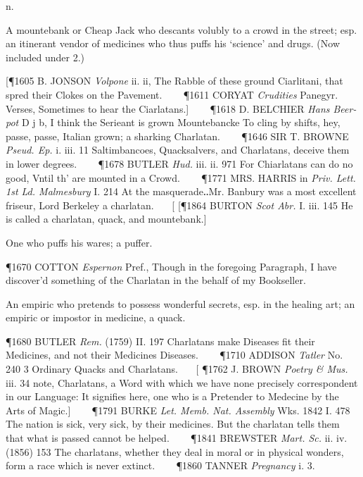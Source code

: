 \begin{description}[wide, labelwidth=!, labelindent=0pt]
\begin{myenumerate}

 n.

 A mountebank or Cheap Jack who descants volubly to a crowd in the street; esp. an itinerant vendor of medicines who thus puffs his ‘science’ and drugs. (Now included under 2.)

[\P 1605 B. JONSON  \textit{Volpone} ii. ii, The Rabble of these ground Ciarlitani, that spred their Clokes on the Pavement.    
\P 1611 CORYAT  \textit{Crudities} Panegyr. Verses, Sometimes to hear the Ciarlatans.]    
\P 1618 D. BELCHIER  \textit{Hans Beer-pot} D j b, I think the Serieant is grown Mountebancke To cling by shifts, hey, passe, passe, Italian grown; a sharking Charlatan.    
\P 1646 SIR T. BROWNE  \textit{Pseud. Ep.} i. iii. 11 Saltimbancoes, Quacksalvers, and Charlatans, deceive them in lower degrees.    
\P 1678 BUTLER  \textit{Hud.} iii. ii. 971 For Chiarlatans can do no good, Vntil th' are mounted in a Crowd.    
\P 1771 MRS. HARRIS in \textit{Priv. Lett. 1st Ld. Malmesbury} I. 214 At the masquerade‥Mr. Banbury was a most excellent friseur, Lord Berkeley a charlatan.    [
[\P 1864 BURTON  \textit{Scot Abr.} I. iii. 145 He is called a charlatan, quack, and mountebank.]

 One who puffs his wares; a puffer.

\P 1670 COTTON  \textit{Espernon} Pref., Though in the foregoing Paragraph, I have discover'd something of the Charlatan in the behalf of my Bookseller.

 An empiric who pretends to possess wonderful secrets, esp. in the healing art; an empiric or impostor in medicine, a quack.

\P 1680 BUTLER  \textit{Rem.} (1759) II. 197 Charlatans make Diseases fit their Medicines, and not their Medicines Diseases.    
\P 1710 ADDISON  \textit{Tatler} No. 240 3 Ordinary Quacks and Charlatans.    [
\P 1762 J. BROWN  \textit{Poetry \& Mus.} iii. 34 note, Charlatans, a Word with which we have none precisely correspondent in our Language: It signifies here, one who is a Pretender to Medecine by the Arts of Magic.]    
\P 1791 BURKE  \textit{Let. Memb. Nat. Assembly} Wks. 1842 I. 478  The nation is sick, very sick, by their medicines. But the charlatan tells them that what is passed cannot be helped.    
\P 1841 BREWSTER  \textit{Mart. Sc.} ii. iv. (1856) 153 The charlatans, whether they deal in moral or in physical wonders, form a race which is never extinct.    
\P 1860 TANNER  \textit{Pregnancy} i. 3.


\end{myenumerate}
\end{description}
